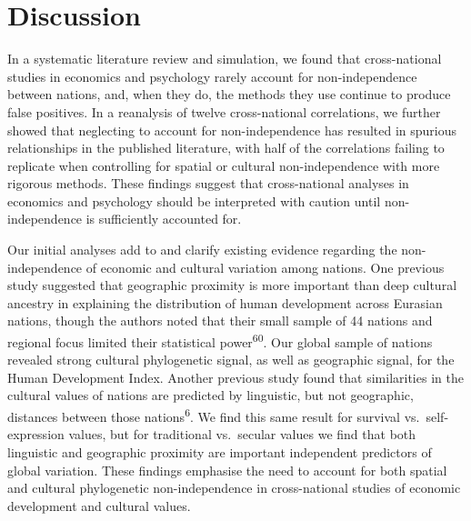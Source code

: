 \documentclass[english,man,floatsintext]{apa6}
\begin{document}
\hypertarget{discussion}{%
\section{Discussion}\label{discussion}}

In a systematic literature review and simulation, we found that cross-national studies in economics and psychology rarely account for non-independence between nations, and, when they do, the methods they use continue to produce false positives. In a reanalysis of twelve cross-national correlations, we further showed that neglecting to account for non-independence has resulted in spurious relationships in the published literature, with half of the correlations failing to replicate when controlling for spatial or cultural non-independence with more rigorous methods. These findings suggest that cross-national analyses in economics and psychology should be interpreted with caution until non-independence is sufficiently accounted for.

Our initial analyses add to and clarify existing evidence regarding the non-independence of economic and cultural variation among nations. One previous study suggested that geographic proximity is more important than deep cultural ancestry in explaining the distribution of human development across Eurasian nations, though the authors noted that their small sample of 44 nations and regional focus limited their statistical power\textsuperscript{60}. Our global sample of nations revealed strong cultural phylogenetic signal, as well as geographic signal, for the Human Development Index. Another previous study found that similarities in the cultural values of nations are predicted by linguistic, but not geographic, distances between those nations\textsuperscript{6}. We find this same result for survival vs.~self-expression values, but for traditional vs.~secular values we find that both linguistic and geographic proximity are important independent predictors of global variation. These findings emphasise the need to account for both spatial and cultural phylogenetic non-independence in cross-national studies of economic development and cultural values.
\end{document}
